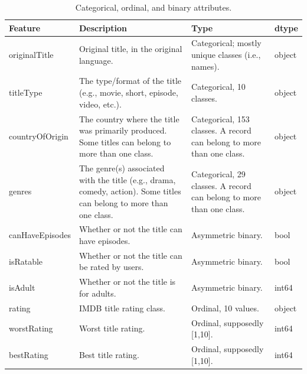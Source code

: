 \begin{table}
    \centering
    \renewcommand{\arraystretch}{1.2}
    \scriptsize
    \begin{tabular}{p{3cm}p{7.5cm}p{3cm}p{0.7cm}}
        \toprule
        \textbf{Feature} & \textbf{Description} & \textbf{Type} & \textbf{dtype} \\ \midrule
        originalTitle & Original title, in the original language. & Categorical; mostly unique classes (i.e., names). & object \\
        titleType & The type/format of the title (e.g., movie, short, episode, video, etc.). & Categorical, 10 classes. & object \\
        countryOfOrigin & The country where the title was primarily produced. Some titles can belong to more than one class. & Categorical, 153 classes. A record can belong to more than one class. & object \\
        genres & The genre(s) associated with the title (e.g., drama, comedy, action). Some titles can belong to more than one class. & Categorical, 29 classes. A record can belong to more than one class. & object \\
        canHaveEpisodes & Whether or not the title can have episodes. & Asymmetric binary. & bool \\
        isRatable & Whether or not the title can be rated by users. & Asymmetric binary. & bool \\
        isAdult & Whether or not the title is for adults. & Asymmetric binary. & int64 \\
        rating & IMDB title rating class. & Ordinal, 10 values. & object \\
        worstRating & Worst title rating. & Ordinal, supposedly [1,10]. & int64 \\
        bestRating & Best title rating. & Ordinal, supposedly [1,10]. & int64 \\ \bottomrule
    \end{tabular}
    \caption{Categorical, ordinal, and binary attributes.}
    \label{tab:original_vars_cat}
\end{table}

